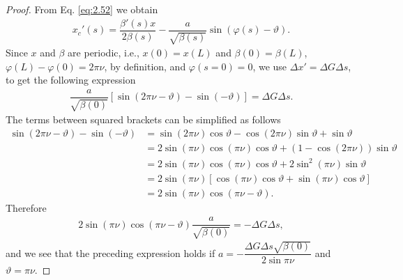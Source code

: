 \documentclass[../sands-adaptation.tex]{subfiles}
\begin{document}
\begin{proof}
From Eq. \eqref{eq:2.52} we obtain
\begin{align*}
x_c'(s) =\dfrac{\beta'(s)x}{2\beta(s)} - \dfrac{a}{\sqrt{\beta(s)}}\sin\left(\varphi(s) - \vartheta\right).
\end{align*}
Since $x$ and $\beta$ are periodic, i.e., $x(0)=x(L)$ and $\beta(0) = \beta(L)$, $\varphi(L) - \varphi(0) = 2 \pi \nu$, by definition, and $\varphi(s=0)=0$, we use $\Delta x' =  \Delta G \Delta s$,
to get the following expression
\begin{align*}
\dfrac{a}{\sqrt{\beta(0)}}\left[\sin(2\pi \nu - \vartheta) - \sin(-\vartheta)\right] = \Delta G \Delta s.
\end{align*}
The terms between squared brackets can be simplified as follows
\begin{align*}
\sin(2\pi \nu - \vartheta) - \sin(-\vartheta) &= \sin(2\pi \nu)\cos\vartheta - \cos(2\pi \nu)\sin \vartheta + \sin \vartheta\\
                                         &= 2\sin(\pi \nu)\cos(\pi \nu)\cos\vartheta + \left(1-\cos(2\pi \nu)\right)\sin\vartheta\\
                                           &= 2\sin(\pi \nu)\cos(\pi \nu)\cos\vartheta + 2\sin^2(\pi \nu)\sin\vartheta\\
                                           &= 2\sin(\pi\nu)\left[\cos(\pi\nu)\cos\vartheta + \sin(\pi\nu)\cos\vartheta\right] \\
                                           &=  2\sin(\pi\nu)\cos(\pi\nu - \vartheta).
\end{align*}
Therefore
\begin{align*}
2\sin(\pi\nu)\cos(\pi\nu - \vartheta)\dfrac{a}{\sqrt{\beta(0)}} = -\Delta G \Delta s,
\end{align*}
and we see that the preceding expression holds if $a = -\dfrac{\Delta G \Delta s \sqrt{\beta(0)}}{2 \sin \pi \nu}$ and $\vartheta = \pi \nu$.
\end{proof}
\end{document}
